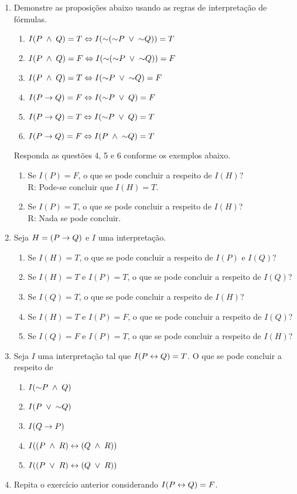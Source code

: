 \begin{enumerate}
  \item Demonstre as proposições abaixo usando as regras de interpretação de fórmulas.
    \begin{enumerate}
      \item $I(P \;\land\; Q) = T \Leftrightarrow I(\mathord{\sim}(\mathord{\sim} P \;\lor\; \mathord{\sim} Q)) = T$
      \item $I(P \;\land\; Q) = F \Leftrightarrow I(\mathord{\sim}(\mathord{\sim} P \;\lor\; \mathord{\sim} Q)) = F$
      \item $I(P \;\land\; Q) = T \Leftrightarrow I(\mathord{\sim} P \;\lor\; \mathord{\sim} Q) = F$
      \item $I(P \rightarrow Q) = F \Leftrightarrow I(\mathord{\sim} P \;\lor\; Q) = F$
      \item $I(P \rightarrow Q) = T \Leftrightarrow I(\mathord{\sim} P \;\lor\; Q) = T$
      \item $I(P \rightarrow Q) = F \Leftrightarrow I(P \;\land\; \mathord{\sim} Q) = T$
    \end{enumerate}
  \noindent
  Responda as questões 4, 5 e 6 conforme os exemplos abaixo.
    \begin{enumerate}
      \item Se $I(P) = F$, o que se pode concluir a respeito de $I(H)$?\\
        R: Pode-se concluir que $I(H) = T$.
      \item Se $I(P) = T$, o que se pode concluir a respeito de $I(H)$?\\
        R: Nada se pode concluir.
    \end{enumerate}
  \item Seja $H = (P \rightarrow Q)$ e $I$ uma interpretação.
    \begin{enumerate}
      \item Se $I(H) = T$, o que se pode concluir a respeito de $I(P)$ e $I(Q)$?
      \item Se $I(H) = T$ e $I(P) = T$, o que se pode concluir a respeito de $I(Q)$?
      \item Se $I(Q) = T$, o que se pode concluir a respeito de $I(H)$?
      \item Se $I(H) = T$ e $I(P) = F$, o que se pode concluir a respeito de $I(Q)$?
      \item Se $I(Q) = F$ e $I(P) = T$, o que se pode concluir a respeito de $I(H)$?
    \end{enumerate}
  \item Seja $I$ uma interpretação tal que $I(P \leftrightarrow Q) = T$. O que se pode concluir a respeito de
    \begin{enumerate}
      \item $I(\mathord{\sim} P \;\land\; Q)$
      \item $I(P \;\lor\; \mathord{\sim} Q)$
      \item $I(Q \rightarrow P)$
      \item $I((P \;\land\; R) \leftrightarrow (Q \;\land\; R))$
      \item $I((P \;\lor\;  R) \leftrightarrow (Q \;\lor\;  R))$
    \end{enumerate}
  \item Repita o exercício anterior considerando $I(P \leftrightarrow Q) = F$.


\end{enumerate}
